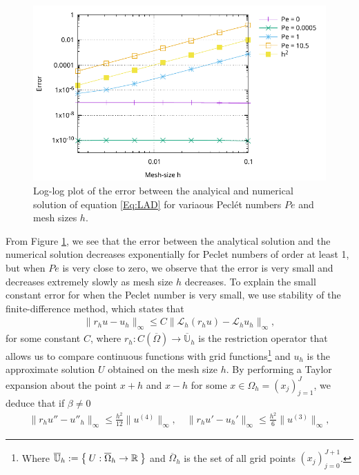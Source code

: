 \documentclass[a4paper,11pt]{article}
\theoremstyle{break}
\theoremstyle{break2}
\theoremstyle{break}
\theoremstyle{break2}
\newcommand{\R}{\mathbb{R}}
\newcommand{\cL}{\mathcal{L}}
\begin{document}
\begin{figure}[h!]
	\centering
	\includegraphics[width=\linewidth]{Error_plots.pdf}
	\caption{Log-log plot of the error between the analyical and numerical solution of equation \eqref{Eq:LAD} for variaous Pecl\'{e}t numbers $ Pe $ and mesh sizes $ h $. \label{Fig:ErrorLAD}}
\end{figure}
\noindent
From Figure \ref{Fig:ErrorLAD}, we see that the error between the analytical solution and the numerical solution decreases exponentially for Peclet numbers of order at least 1, but when $ Pe $ is very close to zero, we observe that the error is very small and decreases extremely slowly as mesh size $ h $ decreases. To explain the small constant error for when the Peclet number is very small, we use stability of the finite-difference method, which states that
\begin{align*}
\|r_hu - u_h\|_{\infty} \leq C \|\cL_h(r_h u) - \cL_h u_h \|_{\infty},
\end{align*}
for some constant $ C $, where $ r_h : C(\overline{\Omega}) \to \overline{\mathbb{U}}_h $ is the restriction operator that allows us to compare continuous functions with grid functions\footnote{Where $ \overline{\mathbb{U}}_h := \Set{U : \overline{\Omega}_h \to \R} $ and $ \overline{\Omega}_h $ is the set of all grid points $ (x_j)_{j=0}^{J+1} $.} and $ u_h $ is the approximate solution $ U $ obtained on the mesh size $ h $. By performing a Taylor expansion about the point $ x + h $ and $ x - h $ for some $ x \in \Omega_h = (x_j)_{j=1}^J $, we deduce that if $ \beta \neq 0 $
\begin{align*}
\|r_h u'' - u''_h\|_{\infty} \leq \frac{h^2}{12}\|u^{(4)}\|_{\infty},\quad \|r_hu' - u_h'\|_{\infty} \leq \frac{h^2}{6}\|u^{(3)}\|_{\infty},
\end{align*}
\end{document}
